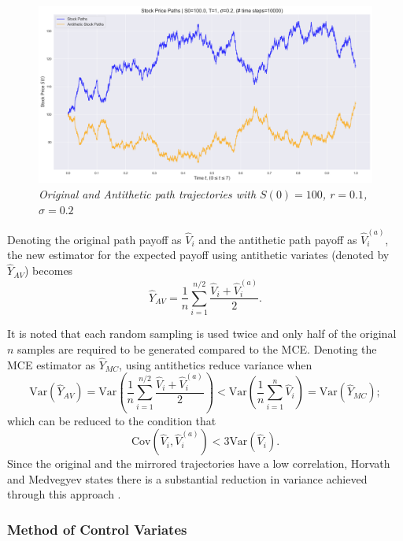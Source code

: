 \begin{figure}[h!]
    \centering
    \includegraphics[width=\linewidth]{./figs/Trajectories.png}
    \caption{\it{Original and Antithetic path trajectories with $S(0) = 100$, $r = 0.1$, $\sigma = 0.2$}}
    \label{fig:figs}
\end{figure}

Denoting the original path payoff as \( \widehat{V}_i \) and the antithetic path payoff as \( \widehat{V}_i^{(a)} \), the new estimator for the expected payoff using antithetic variates (denoted by $\widehat{Y}_{AV}$) becomes
\[
\widehat{Y}_{AV} = \frac{1}{n} \sum_{i=1}^{n/2} \frac{ \widehat{V}_i + \widehat{V}_i^{(a)}}{2}.
\]

It is noted that each random sampling is used twice and only half of the original $n$ samples are required to be generated compared to the MCE. Denoting the MCE estimator as $\widehat{Y}_{MC}$, using antithetics reduce variance when
\[
    \text{Var} \left(\widehat{Y}_{AV}\right) = \text{Var} \left( \frac{1}{n} \sum_{i=1}^{n/2} \frac{ \widehat{V}_i + \widehat{V}_i^{(a)}}{2} \right) < \text{Var}\left(\frac{1}{n} \sum_{i=1}^{n}\hat{V}_i\right) = \text{Var}(\widehat{Y}_{MC});
\]
which can be reduced to the condition that
\[
    \text{Cov} \left(\widehat{V}_i, \widehat{V}_i^{(a)}\right) < 3 \text{Var} \left(\widehat{V}_i\right).
\]
Since the original and the mirrored trajectories have a low correlation, Horvath and Medvegyev states there is a substantial reduction in variance achieved through this approach \cite{nummethods}.

\subsubsection{Method of Control Variates}

